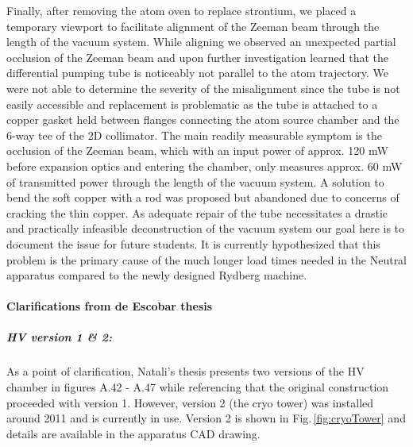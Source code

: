 Finally, after removing the atom oven to replace strontium, we placed a temporary viewport to facilitate alignment of the Zeeman beam through the length of the vacuum system. 
While aligning we observed an unexpected partial occlusion of the Zeeman beam and upon further investigation learned that the differential pumping tube is noticeably not parallel to the atom trajectory.
We were not able to determine the severity of the misalignment since the tube is not easily accessible and replacement is problematic as the tube is attached to a copper gasket held between flanges connecting the atom source chamber and the 6-way tee of the 2D collimator. 
The main readily measurable symptom is the occlusion of the Zeeman beam, which with an input power of approx. 120 mW before expansion optics and entering the chamber, only measures approx. 60 mW of transmitted power through the length of the vacuum system. 
A solution to bend the soft copper with a rod was proposed but abandoned due to concerns of cracking the thin copper.
As adequate repair of the tube necessitates a drastic and practically infeasible deconstruction of the vacuum system our goal here is to document the issue for future students.
It is currently hypothesized that this problem is the primary cause of the much longer load times needed in the Neutral apparatus compared to the newly designed Rydberg machine.

\paragraph{Clarifications from de Escobar thesis}
\subparagraph{HV version 1 \& 2:}
As a point of clarification, Natali's thesis \cite{MartinezdeEscolar2010} presents two versions of the HV chamber in figures A.42 - A.47 while referencing that the original construction proceeded with version 1. 
However, version 2 (the cryo tower) was installed around 2011 and is currently in use. Version 2 is shown in Fig.\,\ref{fig:cryoTower} and details are available in the apparatus CAD drawing.

